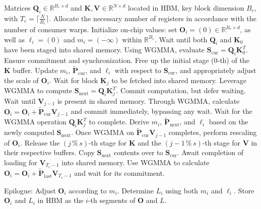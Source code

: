 \begin{algorithm}[H]
    \caption{\small\label{alg:flash3_wgmma}\textsc{FlashAttention-3} consumer warpgroup forward pass}
    \begin{algorithmic}[1]
      \REQUIRE  Matrices $\mathbf{Q}_i \in \mathbb{R}^{B_r \times d}$ and $\mathbf{K}, \mathbf{V} \in \mathbb{R}^{N \times d}$ located in HBM, key block dimension $B_c$, with $T_c = \lceil \frac{N}{B_c} \rceil$.
      \STATE Allocate the necessary number of registers in accordance with the number of consumer warps.
      \STATE Initialize on-chip values: set $\mathbf{O}_i = (0) \in \mathbb{R}^{B_r \times d}$, as well as $\ell_i = (0)$ and $m_i = (-\infty)$ within $\mathbb{R}^{B_r}$.
      \STATE Wait until both $\mathbf{Q}_i$ and $\mathbf{K}_0$ have been staged into shared memory.
      \STATE Using WGMMA, evaluate $\mathbf{S}_{\mathrm{cur}} = \mathbf{Q}_i \mathbf{K}_0^T$. Ensure commitment and synchronization.
      \STATE Free up the initial stage (0-th) of the $\mathbf{K}$ buffer.
      \STATE Update $m_{i}$, $\tilde{\mathbf{P}}_{\mathrm{cur}}$, and $\ell_{i}$ with respect to $\mathbf{S}_{\mathrm{cur}}$, and appropriately adjust the scale of $\mathbf{O}_i$.
        \STATE Wait for block $\mathbf{K}_j$ to be fetched into shared memory.
        \label{code:mainloop_start}
        \STATE Leverage WGMMA to compute $\mathbf{S}_{\mathrm{next}} = \mathbf{Q}_i \mathbf{K}_{j}^T$. Commit computation, but defer waiting. \label{code:first_wgmma}
        \STATE Wait until $\mathbf{V}_{j-1}$ is present in shared memory.
        \STATE Through WGMMA, calculate $\mathbf{O}_{i} = \mathbf{O}_{i} + \tilde{\mathbf{P}}_{\mathrm{cur}} \mathbf{V}_{j-1}$ and commit immediately, bypassing any wait. \label{code:second_wgmma}
        \STATE Wait for the WGMMA operation $\mathbf{Q}_i \mathbf{K}_{j}^T$ to complete.
        \STATE Derive $m_{i}$, $\tilde{\mathbf{P}}_{\mathrm{next}}$, and $\ell_{i}$ based on the newly computed $\mathbf{S}_{\mathrm{next}}$. \label{code:softmax}
        \STATE Once WGMMA on $\tilde{\mathbf{P}}_{\mathrm{cur}} \mathbf{V}_{j-1}$ completes, perform rescaling of $\mathbf{O}_i$.
        \STATE Release the $(j\,\%\,s)$-th stage for $\mathbf{K}$ and the $(j-1\,\%\,s)$-th stage for $\mathbf{V}$ in their respective buffers.
        \STATE Copy $\mathbf{S}_{\mathrm{next}}$ contents over to $\mathbf{S}_{\mathrm{cur}}$.
        \label{code:mainloop_end}
      \ENDFOR
      \STATE Await completion of loading for $\mathbf{V}_{T_c - 1}$ into shared memory.
      \STATE Use WGMMA to calculate 
      $\mathbf{O}_{i} = \mathbf{O}_{i} + \tilde{\mathbf{P}}_{\mathrm{last}} \mathbf{V}_{T_c - 1}$ and wait for its commitment.

\STATE Epilogue: Adjust $\mathbf{O}_{i}$ according to $m_{i}$. Determine $L_{i}$ using both $m_{i}$ and $\ell_{i}$.
      Store $\mathbf{O}_{i}$ and $L_{i}$ in HBM as the $i$-th segments of $\mathbf{O}$ and $L$.
    \end{algorithmic}
  \end{algorithm}


